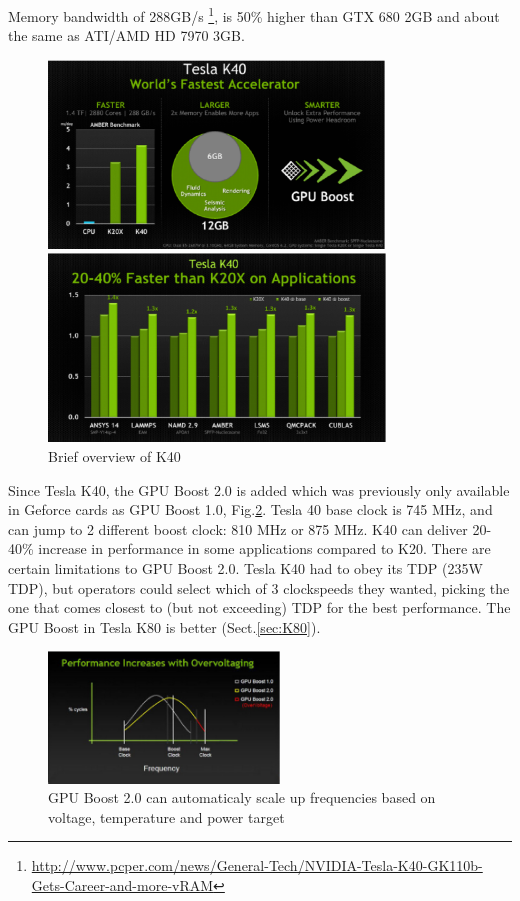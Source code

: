\begin{mdframed}

Memory bandwidth of 288GB/s
 \footnote{\url{http://www.pcper.com/news/General-Tech/NVIDIA-Tesla-K40-GK110b-Gets-Career-and-more-vRAM}},
is 50\% higher than GTX 680 2GB and about the same as ATI/AMD HD 7970 3GB.

\end{mdframed}

\begin{figure}[hbt]
  \centerline{\includegraphics[height=5cm,
    angle=0]{./images/Tesla_K40_benchmark.eps}}
\centerline{\includegraphics[height=5cm,
    angle=0]{./images/Tesla_K40_benchmark2.eps}}    
  \caption{Brief overview of K40}
  \label{fig:Tesla_K40_benchmark}
\end{figure}

Since Tesla K40, the GPU Boost 2.0 is added which was previously only available
in Geforce cards as GPU Boost 1.0, Fig.\ref{fig:GPU_Boost}. Tesla 40 base clock
is 745 MHz, and can jump to 2 different boost clock: 810 MHz or 875 MHz. K40 can
deliver 20-40\% increase in performance in some applications compared to K20.
There are certain limitations to GPU Boost 2.0. Tesla K40 had to obey its TDP
(235W TDP), but operators could select which of 3 clockspeeds they wanted,
picking the one that comes closest to (but not exceeding) TDP for the best performance. The GPU
Boost in Tesla K80 is better (Sect.\ref{sec:K80}).

\begin{figure}[hbt]
  \centerline{\includegraphics[height=3.5cm,
    angle=0]{./images/GPU_Boost.eps}}
  \caption{GPU Boost 2.0 can automaticaly scale up frequencies based on
  voltage, temperature and power target}
  \label{fig:GPU_Boost}
\end{figure}

